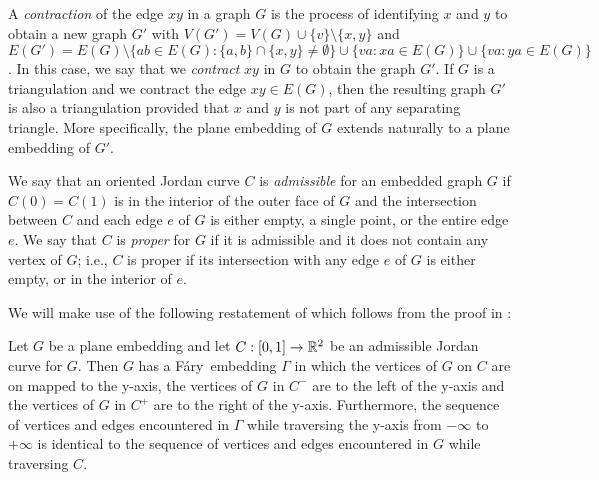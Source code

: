 \documentclass{patmorin}
\newcommand{\Fary}{Fáry}
\begin{document}
A \emph{contraction} of the edge $xy$ in a graph $G$ is the
process of identifying $x$ and $y$ to obtain a new graph $G'$ with
$V(G')=V(G)\cup\{v\}\setminus\{x,y\}$ and $E(G')=E(G)\setminus\{ab\in
E(G): \{a,b\}\cap\{x,y\}\neq\emptyset\}\cup\{va: xa\in E(G)\}\cup
\{va:ya\in E(G)\}$.  In this case, we say that we \emph{contract} $xy$
in $G$ to obtain the graph $G'$.  If $G$ is a triangulation and we
contract the edge $xy\in E(G)$, then the resulting graph $G'$ is also
a triangulation provided that $x$ and $y$ is not part of any separating
triangle. More specifically, the plane embedding of $G$ extends naturally
to a plane embedding of $G'$.

We say that an oriented Jordan curve $C$ is \emph{admissible} for an
embedded graph $G$ if $C(0)=C(1)$ is in the interior of the outer face
of $G$ and the intersection between $C$ and each edge $e$ of $G$ is
either empty, a single point, or the entire edge $e$.  We say that $C$
is \emph{proper} for $G$ if it is admissible and it does not contain any
vertex of $G$; i.e., $C$ is proper if its intersection with any edge $e$
of $G$ is either empty, or in the interior of $e$.


We will make use of the following restatement of 
which follows from the proof in \cite{dalozzo.dujmovic.ea:drawing}:
\begin{thm}
   Let $G$ be a plane embedding and let $C:[0,1]\to\mathbb{R}^2$ be an admissible
   Jordan curve for $G$.  Then $G$ has a \Fary\ embedding $\Gamma$
   in which the vertices of $G$ on $C$ are on mapped to the y-axis,
   the vertices of $G$ in $C^-$ are to the left of the y-axis and the
   vertices of $G$ in $C^+$ are to the right of the y-axis. Furthermore,
   the sequence of vertices and edges encountered in $\Gamma$ while
   traversing the y-axis from $-\infty$ to $+\infty$ is identical to the
   sequence of vertices and edges encountered in $G$ while traversing $C$.
\end{thm}
\end{document}
